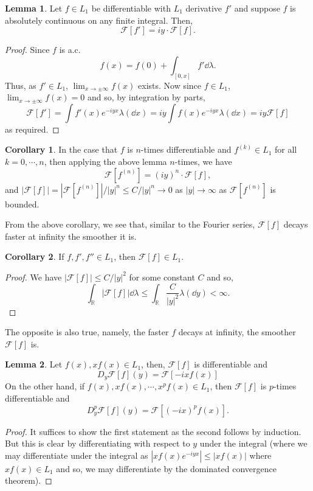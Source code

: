 \documentclass[]{article}
\theoremstyle{definition}
\newtheorem{corollary}{Corollary}[theorem]
\theoremstyle{definition}
\newtheorem{lemma}{Lemma}[section]
\begin{document}
\begin{lemma}
  Let \(f \in L_1\) be differentiable with \(L_1\) derivative \(f'\) and suppose 
  \(f\) is absolutely continuous on any finite integral. Then, 
  \[\mathcal{F}[f'] = iy \cdot \mathcal{F}[f].\] 
\end{lemma}
\begin{proof}
  Since \(f\) is a.c. 
  \[f(x) = f(0) + \int_{[0, x]} f' \dd \lambda.\]
  Thus, as \(f' \in L_1\), \(\lim_{x \to \pm \infty} f(x)\) exists. Now since 
  \(f \in L_1\), \(\lim_{x \to \pm \infty} f(x) = 0\) and so, by integration by 
  parts, 
  \[\mathcal{F}[f'] = \int f'(x)e^{-iyx} \lambda(\dd x) = 
    iy \int f(x)e^{-iy x} \lambda(\dd x) = iy \mathcal{F}[f]\]
  as required.
\end{proof}

\begin{corollary}
  In the case that \(f\) is \(n\)-times differentiable and \(f^(k) \in L_1\)
  for all \(k = 0, \cdots, n\), then applying the above lemma \(n\)-times, 
  we have 
  \[\mathcal{F}[f^{(n)}] = (iy)^n \cdot \mathcal{F}[f],\]
  and \(|\mathcal{F}[f]| = |\mathcal{F}[f^{(n)}]| / |y|^n \le C / |y|^n
    \to 0\) as \(|y| \to \infty\) as \(\mathcal{F}[f^{(n)}]\) is bounded.
\end{corollary}

From the above corollary, we see that, similar to the Fourier series, \(\mathcal{F}[f]\) 
decays faster at infinity the smoother it is. 

\begin{corollary}
  If \(f, f', f'' \in L_1\), then \(\mathcal{F}[f] \in L_1\).
\end{corollary}
\begin{proof}
  We have \(|\mathcal{F}[f]| \le C / |y|^2\) for some constant \(C\) and 
  so, 
  \[\int_{\mathbb{R}} |\mathcal{F}[f]| \dd\lambda \le 
    \int_{\mathbb{R}} \frac{C}{|y|^2} \lambda(\dd y) < \infty.\]
\end{proof}

The opposite is also true, namely, the faster \(f\) decays at infinity, the 
smoother \(\mathcal{F}[f]\) is.

\begin{lemma}
  Let \(f(x), xf(x) \in L_1\), then, \(\mathcal{F}[f]\) is differentiable and 
  \[D_y \mathcal{F}[f](y) = \mathcal{F}[-ixf(x)]\]
  On the other hand, if \(f(x), xf(x), \cdots, x^pf(x) \in L_1\), then 
  \(\mathcal{F}[f]\) is \(p\)-times differentiable and 
  \[D^p_y \mathcal{F}[f](y) = \mathcal{F}[(-ix)^pf(x)].\]
\end{lemma}
\begin{proof}
  It suffices to show the first statement as the second follows by induction. 
  But this is clear by differentiating with respect to \(y\) under the integral 
  (where we may differentiate under the integral as \(|xf(x)e^{-iyx}| \le |xf(x)|\)
  where \(xf(x) \in L_1\) and so, we may differentiate by the dominated convergence 
  theorem).
\end{proof}
\end{document}
